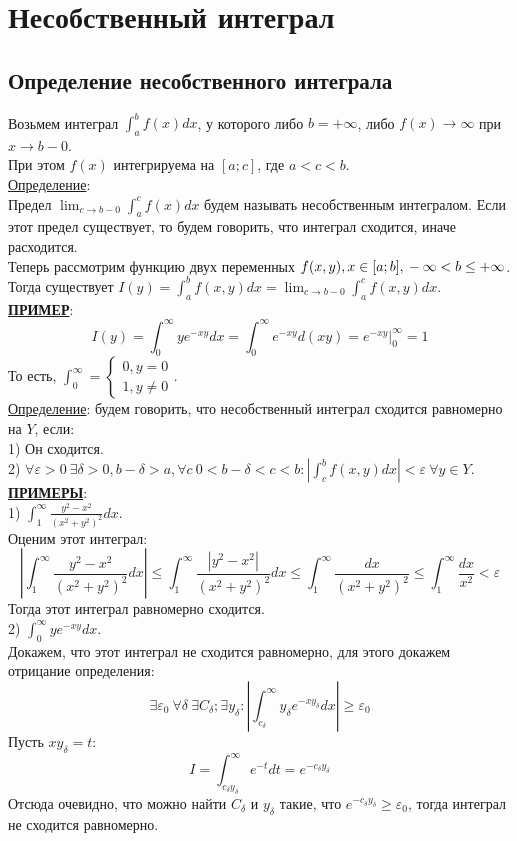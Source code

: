 \documentclass[12pt]{article}
\begin{document}
\section{Несобственный интеграл}
\subsection{Определение несобственного интеграла}
Возьмем интеграл $\int_a^b f(x) dx$, у которого либо $b = +\infty$, либо $f(x) \to \infty$ при $x\to b-0$.\\
При этом $f(x)$ интегрируема на $[a;c]$, где $a<c<b$.\\
\uline{Определение}:\\
Предел $\lim_{c \to b-0} \int_a^c f(x) dx$ будем называть несобственным интегралом. Если этот предел существует, то будем говорить, что интеграл сходится, иначе расходится.\\
Теперь рассмотрим функцию двух переменных $f(x,y), x \in [a;b],\\ -\infty < b \leq +\infty$.\\
Тогда существует $I(y) = \int_a^b f(x,y) dx = \lim_{c \to b-0} \int_a^c f(x,y) dx$.\\
\uline{\textbf{ПРИМЕР}}:\\
$$I(y) = \int_0^{\infty} y e^{-xy} dx = \int_0^{\infty} e^{-xy} d(xy) = e^{-xy} |_0^{\infty} = 1$$
То есть, $\int_0^{\infty} = \begin{cases} 0, y = 0 \\ 1, y \neq 0 \end{cases}$.\\
\uline{Определение}: будем говорить, что несобственный интеграл сходится равномерно на $Y$, если:\\
1) Он сходится.\\
2) $\forall \varepsilon > 0 \ \exists \delta > 0, b-\delta > a, \forall c  \ 0 < b - \delta < c < b : | \int_c^b f(x,y) dx| < \varepsilon \ \forall y \in Y$.\\
\uline{\textbf{ПРИМЕРЫ}}:\\
1) $\int_1^\infty \frac{y^2-x^2}{(x^2+y^2)^2} dx$.\\
Оценим этот интеграл:\\
$$|\int_1^\infty \frac{y^2-x^2}{(x^2+y^2)^2} dx| \leq \int_1^\infty \frac{|y^2-x^2|}{(x^2+y^2)^2} dx \leq \int_1^\infty \frac{dx}{(x^2+y^2)^2} \leq \int_1^\infty \frac{dx}{x^2} < \varepsilon$$
Тогда этот интеграл равномерно сходится.\\
2) $\int_0^{\infty} y e^{-xy} dx$.\\
Докажем, что этот интеграл не сходится равномерно, для этого докажем отрицание определения:\\
$$\exists \varepsilon_0 \ \forall \delta \ \exists C_\delta; \exists y_\delta : |\int_{c_\delta}^\infty y_\delta e^{-xy_\delta} dx | \geq \varepsilon_0$$
Пусть $xy_\delta = t$:\\
$$I = \int_{c_\delta y_\delta}^\infty e^{-t} dt = e^{-c_\delta y_\delta}$$
Отсюда очевидно, что можно найти $C_\delta$ и $y_\delta$ такие, что $e^{-c_\delta y_\delta} \geq \varepsilon_0$, тогда интеграл не сходится равномерно.\\
\end{document}
